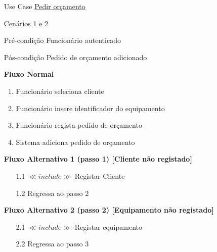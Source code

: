 \documentclass[../relatorio.tex]{subfiles}
\begin{document}
\begin{itemize}
	\item[Use Case] {\underline{Pedir orçamento}}
	\item[Cenários] {1 e 2}
	\item[Pré-condição] {Funcionário autenticado}
	\item[Pós-condição] {Pedido de orçamento adicionado}
	      \begin{flushleft}
		      \textbf{Fluxo Normal}
	      \end{flushleft}
	      \begin{enumerate}
		      \item Funcionário seleciona cliente
		      \item Funcionário insere identificador do equipamento
		      \item Funcionário regista pedido de orçamento
		      \item Sistema adiciona pedido de orçamento
	      \end{enumerate}
	      \begin{flushleft}
		      \textbf{Fluxo Alternativo 1 (passo 1) [Cliente não registado]}
	      \end{flushleft}

	      \begin{itemize}
		      \item[1.1]{$\ll include \gg$ Registar Cliente}
		      \item[1.2] {Regressa ao passo 2}
	      \end{itemize}
	      \begin{flushleft}
		      \textbf{Fluxo Alternativo 2 (passo 2) [Equipamento não registado]}
	      \end{flushleft}
	      \begin{itemize}
		      \item[2.1] $\ll include \gg$ Registar equipamento
		      \item[2.2] Regressa ao passo 3
	      \end{itemize}
\end{itemize}
\end{document}
